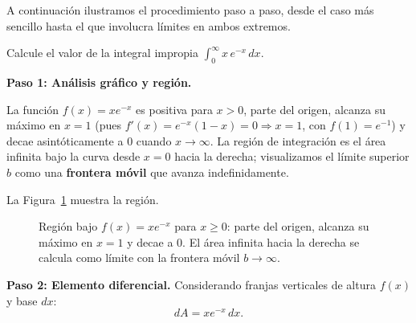 A continuación ilustramos el procedimiento paso a paso, desde el caso más sencillo hasta el
que involucra límites en ambos extremos.

\begin{example}
Calcule el valor de la integral impropia
$\displaystyle\int_{0}^{\infty} x\,e^{-x}\,dx$.
\begin{myproof}
\textbf{Paso 1: Análisis gráfico y región.}

La función $f(x)=xe^{-x}$ es positiva para $x>0$, parte del origen, alcanza su máximo en
$x=1$ (pues $f'(x)=e^{-x}(1-x)=0\Rightarrow x=1$, con $f(1)=e^{-1}$) y decae asintóticamente a
$0$ cuando $x\to\infty$. La región de integración es el área infinita bajo la curva desde $x=0$
hacia la derecha; visualizamos el límite superior $b$ como una \textbf{frontera móvil} que avanza
indefinidamente.

La Figura~\ref{fig:impropia_xe_menosx} muestra la región.

\begin{figure}[H]
\centering
{}
\caption{Región bajo $f(x)=xe^{-x}$ para $x\geq 0$: parte del origen, alcanza su máximo en $x=1$ y decae a $0$. El área infinita hacia la derecha se calcula como límite con la frontera móvil $b\to\infty$.}
\label{fig:impropia_xe_menosx}
\end{figure}

\textbf{Paso 2: Elemento diferencial.}
Considerando franjas verticales de altura $f(x)$ y base $dx$:
\[
  dA = xe^{-x}\,dx.
\]


\end{myproof}
\end{example}
